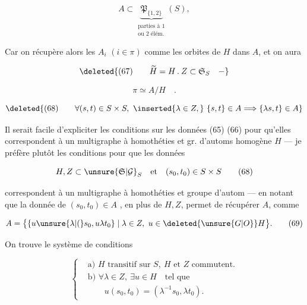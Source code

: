 \[
A\subset\underbrace{\mathfrak P_{\{1,2\}}}_{\substack{\text{parties à }1\\\text{ou }2\text{ élém.}}}(S),
\tag*{(66)}
\]

 Car on récupère alors les $A_i$ $(i\in\pi)$ comme  les orbites de $H$ dans $A$, et on aura

\[
\deleted{(67)\qquad\widetilde H=H\mathbin{.} Z\subset\mathfrak S_S\quad -}
\]

\[
\pi\simeq A/H\quad .
\tag*{(67.)}
\]

 


\[
\deleted{(68)\qquad\forall(s,t)\in S\times S,\ \inserted{\lambda\in Z,}\ \{s,t\}\in A\Longrightarrow\{\lambda s,t\}\in A}
\]



Il serait facile d'expliciter les conditions sur les données (65) (66) pour qu'elles correspondent à un multigraphe à homothéties et gr. d'automs homogène $H$ --- je préfère plutôt  les conditions pour que les données

\[
H,Z\subset\unsure{\mathfrak S|\mathcal G}_S\quad\text{et}\quad (s_0,t_0)\in S\times S
\tag*{(68)}
\]

correspondent à un multigraphe à homothéties et groupe d'autom  --- en notant que la donnée de $(s_0,t_0)\in A$ , en plus de $H,Z$, permet de récupérer $A$, comme

\[
A=\bigl\{\{u\unsure{\lambda|(}s_0,u\lambda t_0\}\mid\lambda\in Z,\ u\in\deleted{\unsure{G|O}}H\bigr\}.
\tag*{(69)}
\]

On trouve le système de conditions

\[
\left\{\begin{aligned}
&\text{a) }H\text{ transitif sur }S,\ H\text{ et }Z\text{ commutent.}\\
&\text{b) }\forall\lambda\in Z,\ \exists u\in H\quad\text{tel que}\\
&\qquad u(s_0,t_0)=(\lambda^{-1}s_0,\lambda t_0).
\end{aligned}\right.
\tag*{(70)}
\]

